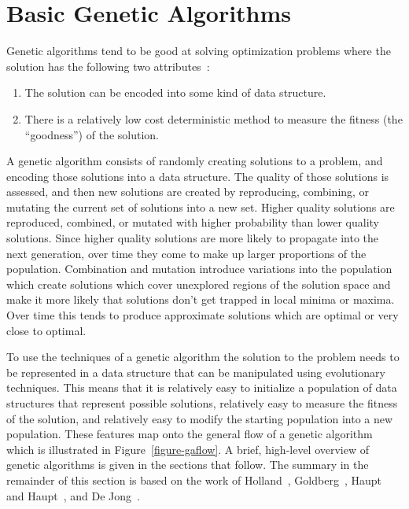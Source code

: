 \section{Basic Genetic Algorithms}

Genetic algorithms tend to be good at solving optimization problems where the
solution has the following two attributes~\cite{Holland1992,
goldberg1989genetic, fogel2000evolutionary, haupt2004practical}:

\begin{enumerate}
  \item {The solution can be encoded into some kind of data structure.}
  \item {There is a relatively low cost deterministic method to measure the
  fitness (the ``goodness'') of the solution.}
\end{enumerate}

A genetic algorithm consists of randomly creating solutions to a problem, and
encoding those solutions into a data structure. The quality of those solutions
is assessed, and then new solutions are created by reproducing, combining, or
mutating the current set of solutions into a new set. Higher quality solutions
are reproduced, combined, or mutated with higher probability than lower quality
solutions. Since higher quality solutions are more likely to propagate into the
next generation, over time they come to make up larger proportions of the
population. Combination and mutation introduce variations into the population
which create solutions which cover unexplored regions of the solution space and
make it more likely that solutions don't get trapped in local minima or maxima.
Over time this tends to produce approximate solutions which are optimal or very
close to optimal.

To use the techniques of a genetic algorithm the solution to the problem needs
to be represented in a data structure that can be manipulated using evolutionary
techniques. This means that it is relatively easy to initialize a population of
data structures that represent possible solutions, relatively easy to measure
the fitness of the solution, and relatively easy to modify the starting
population into a new population. These features map onto the general flow of a
genetic algorithm which is illustrated in Figure~\ref{figure-gaflow}. A brief,
high-level overview of genetic algorithms is given in the sections that follow.
The summary in the remainder of this section is based on the work of
Holland~\cite{Holland1992}, Goldberg~\cite{goldberg1989genetic}, Haupt and
Haupt~\cite{haupt2004practical}, and De Jong~\cite{dejong2006evolutionary}.

